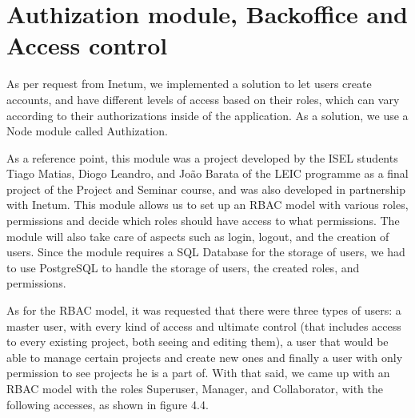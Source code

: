 \documentclass[a4paper,twoside,10pt]{report}
\begin{document}
\newpage
\section{Authization module, Backoffice and Access control}
As per request from Inetum, we implemented a solution to let users create accounts, and have different levels of access based on their roles, which can vary according to their authorizations inside of the application. 
As a solution, we use a Node module called Authization\cite{AUTHIZATION}. 

As a reference point, this module was a project developed by the ISEL students Tiago Matias, Diogo Leandro, and João Barata of the LEIC programme as a final project of the Project and Seminar course, and was also developed in partnership with Inetum. This module allows us to set up an RBAC model with various roles, permissions and decide which roles should have access to what permissions. The module will also take care of aspects such as login, logout, and the creation of users. Since the module requires a SQL Database for the storage of users, we had to use PostgreSQL\cite{POSTGRESQL} to handle the storage of users, the created roles, and permissions.

As for the RBAC model, it was requested that there were three types of users: a master user, with every kind of access and ultimate control (that includes access to every existing project, both seeing and editing them), a user that would be able to manage certain projects and create new ones and finally a user with only permission to see projects he is a part of.
With that said, we came up with an RBAC model with the roles Superuser, Manager, and Collaborator, with the following accesses, as shown in figure 4.4.
 
\end{document}

